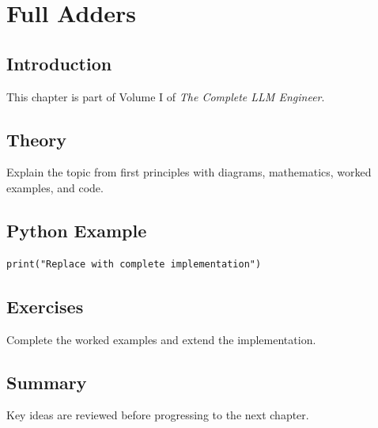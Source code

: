 \chapter{Full Adders}
\label{chap:full-adders}



\section{Introduction}
This chapter is part of Volume I of \emph{The Complete LLM Engineer}.

\section{Theory}
Explain the topic from first principles with diagrams, mathematics, worked examples,
and code.

\section{Python Example}
\begin{lstlisting}
print("Replace with complete implementation")
\end{lstlisting}

\section{Exercises}
\begin{exercise}
Complete the worked examples and extend the implementation.
\end{exercise}

\section{Summary}
Key ideas are reviewed before progressing to the next chapter.
